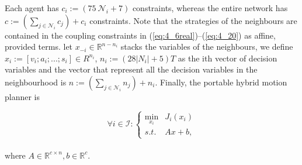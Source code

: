 Each agent has $c_i:= (75 \ \mathcal{N}_i + 7)$ constraints, whereas the entire network has $c := (\sum_{j \in \mathcal{N}_i}{c_j}) + c_i$ constraints. Note that the strategies of the neighbours are contained in the coupling constraints in (\ref{eq:4_6real})–(\ref{eq:4_20}) as affine, provided terms. let $x_{-i} \in  \mathbb{R}^{n-n_i}$ stacks the variables of the neighbours, we define $x_i:= [v_i;a_i;...;s_i] \in R^{n_i}$, $n_i:=(28|N_i|+5)T$ as the i\-th vector of decision variables and the vector that represent all the decision variables in the neighbourhood is $n:=(\sum_{j \in \mathcal{N}_i}n_j)+n_i$. Finally, the portable hybrid motion planner is

\begin{equation}
    \forall i \in \mathcal{I} : \left\{ \begin{array}{cl}
\min_{x_i} & J_i(x_i)\\
s.t. & A x +b,
\end{array} \right.
\end{equation}
\\

where $A \in \mathbb{R}^{c\times n}, b \in \mathbb{R}^c$.


